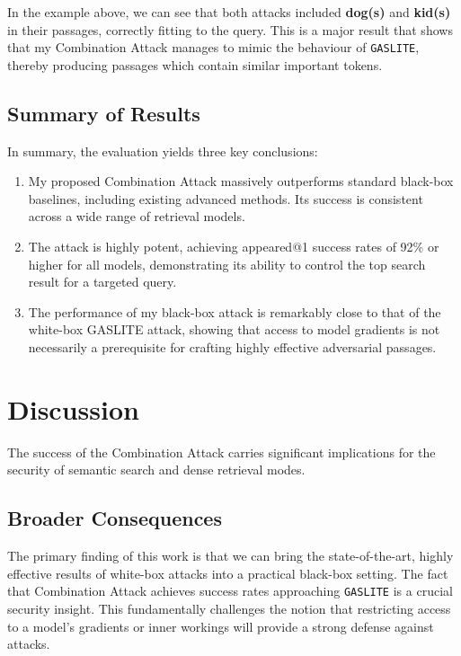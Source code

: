 \documentclass[a4paper, sigconf]{acmart}
\begin{document}
In the example above, we can see that both attacks included \textbf{dog(s)} and \textbf{kid(s)} in their passages, correctly fitting to the query. This is a major result that shows that my Combination Attack manages to mimic the behaviour of \texttt{GASLITE}, thereby producing passages which contain similar important tokens.

\subsection{Summary of Results}

In summary, the evaluation yields three key conclusions:
\begin{enumerate}
  \item My proposed Combination Attack massively outperforms standard black-box baselines, including existing advanced methods. Its success is consistent across a wide range of retrieval models.
  \item The attack is highly potent, achieving appeared@1 success rates of 92\% or higher for all models, demonstrating its ability to control the top search result for a targeted query.
  \item The performance of my black-box attack is remarkably close to that of the white-box GASLITE attack, showing that access to model gradients is not necessarily a prerequisite for crafting highly effective adversarial passages.
\end{enumerate}


\section{Discussion}

The success of the Combination Attack carries significant implications for the security of semantic search and dense retrieval modes.


\subsection{Broader Consequences}

The primary finding of this work is that we can bring the state-of-the-art, highly effective results of white-box attacks into a practical black-box setting. The fact that Combination Attack achieves success rates approaching \texttt{GASLITE} is a crucial security insight. This fundamentally challenges the notion that restricting access to a model's gradients or inner workings will provide a strong defense against attacks. 
\end{document}
